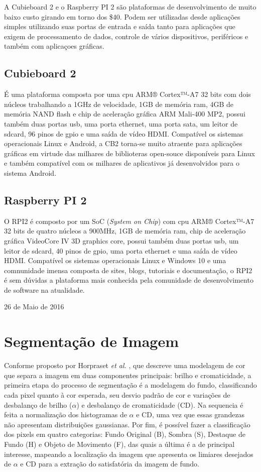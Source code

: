 \documentclass[conference]{IEEEtran}
\begin{document}
A Cubieboard 2 e o Raspberry PI 2 são plataformas de desenvolvimento de muito baixo custo girando em torno dos \$40. Podem ser utilizadas desde aplicações simples utilizando suas portas de entrada e saída tanto para aplicações que exigem de processamento de dados, controle de vários dispositivos, periféricos e também com aplicaçoes gráficas.

\subsection{Cubieboard 2}
É uma plataforma composta por uma cpu ARM® Cortex™-A7 32 bits com dois núcleos trabalhando a 1GHz de velocidade, 1GB de memória ram, 4GB de memória NAND flash e chip de aceleração gráfica ARM Mali-400 MP2, possui também duas portas usb, uma porta ethernet, uma porta sata, um leitor de sdcard, 96 pinos de gpio e uma saída de vídeo HDMI. Compatível os sistemas operacionais Linux e Android, a CB2 torna-se muito atraente para aplicações gráficas em virtude das milhares de biblioteras open-souce disponíveis para Linux e também compatível com os milhares de aplicativos já desenvolvidos para o sistema Android.


\subsection{Raspberry PI 2}
O RPI2  é composto por um SoC (\textit{System on Chip}) com cpu ARM® Cortex™-A7 32 bits de quatro núcleos a 900MHz, 1GB de memória ram, chip de aceleração gráfica VideoCore IV 3D graphics core, possui também duas portas usb, um leitor de sdcard, 40 pinos de gpio, uma porta ethernet e uma saída de vídeo HDMI. Compatível os sistemas operacionais Linux e Windows 10 e uma comnunidade imensa composta de sites, blogs, tutoriais e documentação, o RPI2 é sem dúvidas a plataforma mais conhecida pela comunidade de desenvolvimento de software na atualidade.


\hfill 26 de Maio de 2016

\section{Segmentação de Imagem}
Conforme proposto por Horpraset \textit{et al.} \cite{IEEEhowto:horprasert}, que descreve uma modelagem de cor que separa a imagem em duas componentes principais: brilho e cromaticidade, a primeira etapa do processo de segmentação é a modelagem do fundo, classificando cada pixel quanto à cor esperada, seu desvio padrão de cor e variações de desbalanço de brilho (\(\alpha\)) e desbalanço de cromaticidade (CD). Na sequencia é feita a normalização dos histogramas de \(\alpha\) e CD, uma vez que essas grandezas não apresentam distribuições gaussianas. Por fim, é possível fazer a classificação dos pixels em quatro categorias: Fundo Original (B), Sombra (S), Destaque de Fundo (H) e Objeto de Movimento (F), das quais a última é a de principal interesse, mapeando a localização da imagem que apresenta os limiares desejados de \(\alpha\) e CD para a extração do satisfatória da imagem de fundo.
\end{document}
